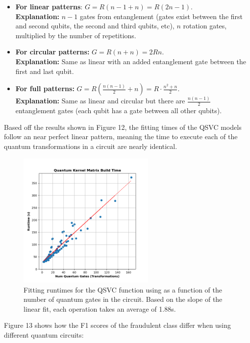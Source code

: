 \documentclass[11pt, oneside]{article}   	%
\begin{document}
\begin{itemize}
	\item \textbf{For linear patterns}: $G=R(n-1 + n) = R(2n-1)$. \\ \textbf{Explanation:} $n-1$ gates from entanglement (gates exist between the first and second qubits, the second and third qubits, etc), $n$ rotation gates, multiplied by the number of repetitions.
	\item \textbf{For circular patterns:} $G=R(n + n) = 2Rn$. \\ \textbf{Explanation:} Same as linear with an added entanglement gate between the first and last qubit.
	\item \textbf{For full patterns:} $G=R(\frac{n(n-1)}{2} + n) = R\cdot \frac{n^2+n}{2}$. \\ \textbf{Explanation:} Same as linear and circular but there are $\frac{n(n-1)}{2}$ entanglement gates (each qubit has a gate between all other qubits). 
\end{itemize}

Based off the results shown in Figure 12, the fitting times of the QSVC models follow an near perfect linear pattern, meaning the time to execute each of the quantum transformations in a circuit are nearly identical.  

\begin{figure}[h!]
    \centering
    \includegraphics[width=0.6\textwidth]{figures/fig_12.png}
    \captionsetup{font=small} 
    \caption{Fitting runtimes for the QSVC function using as a function of the number of quantum gates in the circuit. Based on the slope of the linear fit, each operation takes an average of 1.88s.}
    \label{fig12}
\end{figure}

Figure 13 shows how the F1 scores of the fraudulent class differ when using different quantum circuits:
\end{document}

